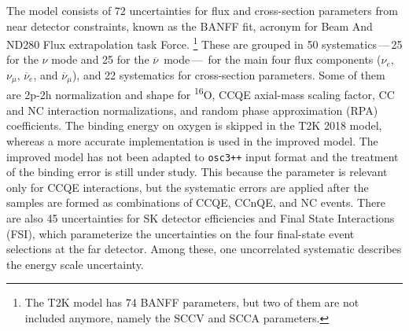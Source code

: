 \documentclass[a4paper, 11pt]{article}
\newcommand{\cj}{\overline}
\newcommand{\tapi}{\textsuperscript}
\begin{document}
The model consists of 72 uncertainties for flux and cross-section parameters from near detector constraints, %
known as the BANFF fit, acronym for Beam And ND280 Flux extrapolation task Force.%
\footnote{The T2K model has 74 BANFF parameters, but two of them are not included anymore, namely the SCCV and SCCA parameters.}
These are grouped in 50 systematics\,---\,25 for the $\nu$ mode and 25 for the $\cj{\nu}$~mode\,---\,%
for the main four flux components ($\nu_e$, $\nu_\mu$, $\cj{\nu}_e$, and $\cj{\nu}_\mu$), %
and 22 systematics for cross-section parameters.
Some of them are 2p-2h normalization and shape for \tapi{16}O, CCQE axial-mass scaling factor, %
CC and NC interaction normalizations, and random phase approximation (RPA) coefficients.
The binding energy on oxygen is skipped in the T2K 2018 model, whereas a more accurate implementation is used in the improved model.
The improved model has not been adapted to \texttt{osc3++} input format and the treatment of the binding error is still under study.
This because the parameter is relevant only for CCQE interactions, but the systematic errors are applied %
after the samples are formed as combinations of CCQE, CCnQE, and NC events.
There are also 45 uncertainties for SK detector efficiencies and Final State Interactions (FSI),
which parameterize the uncertainties on the four final-state event selections at the far detector. %
Among these, one uncorrelated systematic describes the energy scale uncertainty.
\end{document}
